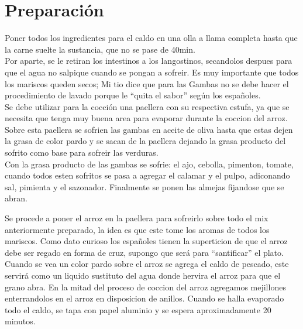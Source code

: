 \section*{Preparación}
Poner todos los ingredientes para el caldo en una olla a llama completa hasta que la carne suelte la sustancia, que no se pase de 40min.\\

Por aparte, se le retiran los intestinos a los langostinos, secandolos despues para que el agua no salpique cuando se pongan a sofreir. Es muy importante que todos los mariscos queden secos; Mi tio dice que para las Gambas no se debe hacer el procedimiento de lavado porque le “quita el sabor” según los españoles.\\

Se debe utilizar para la cocción una paellera con su respectiva estufa, ya que se necesita que tenga muy buena area para evaporar durante la coccion del arroz. Sobre esta paellera se sofrien las gambas en aceite de oliva hasta que estas dejen la grasa de color pardo y se sacan de la paellera dejando la grasa producto del sofrito como base para sofreir las verduras.\\

Con la grasa producto de las gambas se sofrie: el ajo, cebolla, pimenton, tomate, cuando todos esten sofritos se pasa a agregar el calamar y el pulpo, adiconando sal, pimienta y el sazonador. Finalmente se ponen las almejas fijandose que se abran.

Se procede a poner el arroz en la paellera para sofreirlo sobre todo el mix anteriormente preparado, la idea es que este tome los aromas de todos los mariscos. Como dato curioso los españoles tienen la superticion de que el arroz debe ser regado en forma de cruz, supongo que será para “santificar” el plato.\\

Cuando se vea un color pardo sobre el arroz se agrega el caldo de pescado, este servirá como un liquido sustituto del agua donde hervira el arroz para que el grano abra. En la mitad del proceso de coccion del arroz agregamos mejillones enterrandolos en el arroz en disposicion de anillos. Cuando se halla evaporado todo el caldo, se tapa con papel aluminio y se espera aproximadamente 20 minutos.